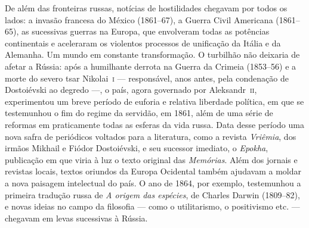 De além das fronteiras russas, notícias de hostilidades chegavam por todos os
lados: a invasão francesa do México (1861--67), a Guerra Civil Americana
(1861--65), as sucessivas guerras na Europa, que envolveram todas as potências
continentais e aceleraram os violentos processos de unificação da Itália e da
Alemanha. Um mundo em constante transformação. O turbilhão não deixaria de
afetar a Rússia: após a humilhante derrota na Guerra da Crimeia (1853--56) e a
morte do severo tsar Nikolai~\textsc{i} --- responsável, anos antes, pela condenação de
Dostoiévski ao degredo ---, o país, agora governado por Aleksandr~\textsc{ii},
experimentou um breve período de euforia e relativa liberdade política, em que
se testemunhou o fim do regime da servidão, em 1861, além de uma série de
reformas em praticamente todas as esferas da vida russa. Data desse período uma
nova safra de periódicos voltados para a literatura, como a revista
\textit{Vriêmia}, dos irmãos Mikhail e Fiódor Dostoiévski, e seu sucessor
imediato, o \textit{Epokha}, publicação em que viria à luz o texto original das
\textit{Memórias}. Além dos jornais e revistas locais, textos oriundos da
Europa Ocidental também ajudavam a moldar a nova paisagem intelectual do país.
O ano de 1864, por exemplo, testemunhou a primeira tradução russa de \textit{A
origem das espécies}, de Charles Darwin (1809--82), e novas ideias no campo da
filosofia --- como o utilitarismo, o positivismo etc. --- chegavam em levas sucessivas à Rússia.

